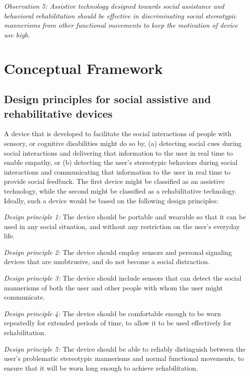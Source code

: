 \documentclass[oneside,11pt]{memoir}
\begin{document}
\emph{Observation 5: Assistive technology designed towards social assistance and behavioral rehabilitation should be effective in discriminating social stereotypic mannerisms from other functional movements to keep the motivation of device use high.}


\section{Conceptual Framework}
\subsection{Design principles for social assistive and rehabilitative devices}
A device that is developed to facilitate the social interactions of people with sensory, or cognitive disabilities might do so by, (a) detecting social cues during social interactions and delivering that information to the user in real time to enable empathy, or (b) detecting the user's stereotypic behaviors during social interactions and communicating that information to the user in real time to provide social feedback.  The first device might be classified as an assistive technology, while the second might be classified as a rehabilitative technology.  Ideally, such a device would be based on the following design principles:

\begingroup
{}
\setlength{\parindent}{0in}
\emph{Design principle 1:} The device should be portable and wearable so that it can be used in any social situation, and without any restriction on the user's everyday life.

\emph{Design principle 2:} The device should employ sensors and personal signaling devices that are unobtrusive, and do not become a social distraction.

\emph{Design principle 3:} The device should include sensors that can detect the social mannerisms of both the user and other people with whom the user might communicate.

\emph{Design principle 4:} The device should be comfortable enough to be worn repeatedly for extended periods of time, to allow it to be used effectively for rehabilitation.

\emph{Design principle 5:} The device should be able to reliably distinguish between the user's problematic stereotypic mannerisms and normal functional movements, to ensure that it will be worn long enough to achieve rehabilitation.

\endgroup
\end{document}
